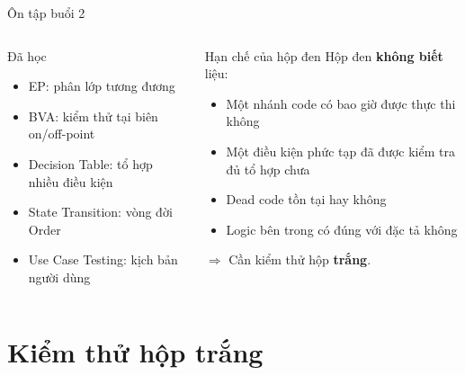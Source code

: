 \documentclass[aspectratio=169,12pt]{beamer}
\begin{document}
\begin{frame}[shrink=10]{Ôn tập buổi 2}
  \begin{columns}
    \begin{block}{Đã học}
      \begin{itemize}
        \item EP: phân lớp tương đương
        \item BVA: kiểm thử tại biên on/off-point
        \item Decision Table: tổ hợp nhiều điều kiện
        \item State Transition: vòng đời Order
        \item Use Case Testing: kịch bản người dùng
      \end{itemize}
    \end{block}

    \begin{alertblock}{Hạn chế của hộp đen}
      Hộp đen \textbf{không biết} liệu:
      \begin{itemize}
        \item Một nhánh code có bao giờ được thực thi không
        \item Một điều kiện phức tạp đã được kiểm tra đủ tổ hợp chưa
        \item Dead code tồn tại hay không
        \item Logic bên trong có đúng với đặc tả không
      \end{itemize}
      $\Rightarrow$ Cần kiểm thử hộp \textbf{trắng}.
    \end{alertblock}
  \end{columns}
\end{frame}

\section{Kiểm thử hộp trắng}
\end{document}
